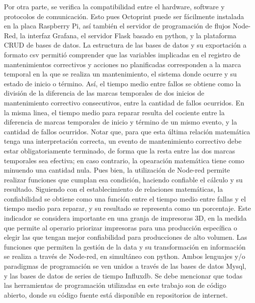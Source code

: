 Por otra parte, se verifica la compatibilidad entre el hardware, software y protocolos de comunicación. Esto pues Octoprint puede ser fácilmente instalada en la placa Raspberry Pi, así también el servidor de programación de flujos Node-Red, la interfaz Grafana, el servidor Flask basado en python, y la plataforma CRUD de bases de datos. La estructura de las bases de datos y su exportación a formato csv permitió comprender que las variables implicadas en el registro de mantenimientos correctivos y acciones no planificadas corresponden a la marca temporal en la que se realiza un mantenimiento, el sistema donde ocurre y su estado de inicio o término. Así, el tiempo medio entre fallos se obtiene como la división de la diferencia de las marcas temporales de dos inicios de mantenimiento correctivo consecutivos, entre la cantidad de fallos ocurridos. En la misma linea, el tiempo medio para reparar resulta del cociente entre la diferencia de marcas temporales de inicio y término de un mismo evento, y la cantidad de fallos ocurridos. Notar que, para que esta última relación matemática tenga una interpretación correcta, un evento de mantenimiento correctivo debe estar obligatoriamente terminado, de forma que la resta entre las dos marcas temporales sea efectiva; en caso contrario, la opearación matemática tiene como minuendo una cantidad nula. Pues bien, la utilización de Node-red permite realizar funciones que cumplan esa condición, haciendo confiable el cálculo y su resultado. Siguiendo con el establecimiento de relaciones matemáticas, la confiabilidad se obtiene como una función entre el tiempo medio entre fallas y el tiempo medio para reparar, y su resultado se representa como un porcentaje. Este indicador se considera importante en una granja de impresoras 3D, en la medida que permite al operario priorizar impresoras para una producción específica o elegir las que tengan mejor confiabilidad para producciones de alto volumen. Las funciones que permiten la gestión de la data y su transformación en información se realiza a través de Node-red, en simultáneo con python. Ambos lenguajes y/o paradigmas de programación se ven unidos a través de las bases de datos Mysql, y las bases de datos de series de tiempo Influxdb. Se debe mencionar que todas las herramientas de programación utilizadas en este trabajo son de código abierto, donde su código fuente está disponible en repositorios de internet. 
